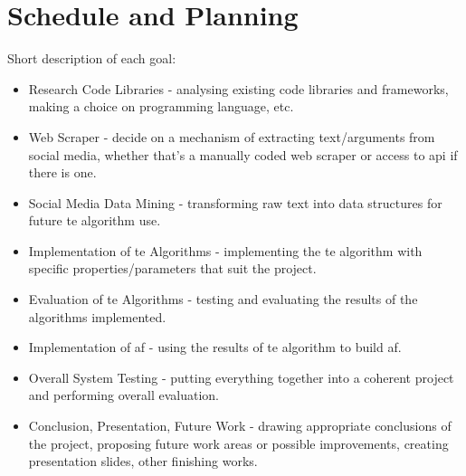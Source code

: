 \section{Schedule and Planning} \label{apx_A}
    
    
    Short description of each goal:
    \begin{itemize}
        \item Research Code Libraries - analysing existing code libraries and frameworks, making a choice on programming language, etc.
        \item Web Scraper - decide on a mechanism of extracting text/arguments from social media, whether that's a manually coded web scraper or access to \gls{api} if there is one.
        \item Social Media Data Mining - transforming raw text into data structures for future \gls{te} algorithm use.
        \item Implementation of \gls{te} Algorithms - implementing the \gls{te} algorithm with specific properties/parameters that suit the project.
        \item Evaluation of \gls{te} Algorithms - testing and evaluating the results of the algorithms implemented.
        \item Implementation of \gls{af} - using the results of \gls{te} algorithm to build \gls{af}.
        \item Overall System Testing - putting everything together into a coherent project and performing overall evaluation.
        \item Conclusion, Presentation, Future Work - drawing appropriate conclusions of the project, proposing future work areas or possible improvements, creating presentation slides, other finishing works.
    \end{itemize}
